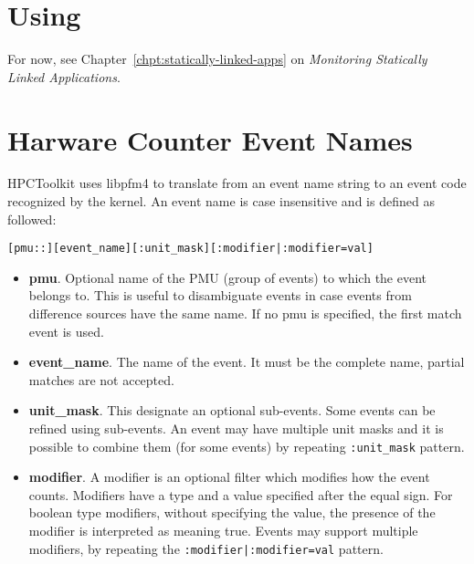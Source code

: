 
\section{Using \hpclink{}}

For now, see Chapter~\ref{chpt:statically-linked-apps} on {\it
Monitoring Statically Linked Applications}.


\section{Harware Counter Event Names}

HPCToolkit uses libpfm4\cite{libpfm-www} to translate from an event name string to an event code recognized by the kernel. 
An event name is case insensitive and is defined as followed:
\begin{verbatim}
[pmu::][event_name][:unit_mask][:modifier|:modifier=val] 
\end{verbatim}

\begin{itemize}
	\item \textbf{pmu}.  Optional name of the PMU (group of events) to which the event belongs to. This is useful to disambiguate events in case events from difference sources have the same name. If no pmu is specified, the first match event is used.
	\item \textbf{event\_name}.  The name of the event. It must be the complete name, partial matches are not accepted. 
	\item \textbf{unit\_mask}.  This designate an optional sub-events. Some events can be refined using sub-events. An event may have multiple unit masks and it is possible to combine them (for some events) by repeating \texttt{:unit\_mask} pattern.
	\item \textbf{modifier}.  A modifier is an optional filter which modifies how the event counts. Modifiers have a type and a value specified after the equal sign. 
		For boolean type modifiers, without specifying the value, the presence of the modifier is interpreted as meaning true. Events may support multiple modifiers, by repeating the \texttt{:modifier|:modifier=val} pattern. 
\end{itemize}



